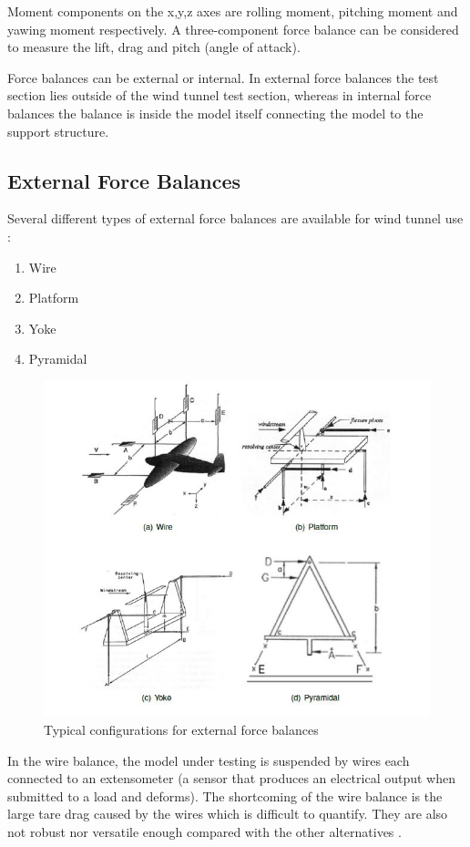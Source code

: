 Moment components on the x,y,z axes are rolling moment, pitching moment and yawing moment respectively. A three-component force balance can be considered to measure the lift, drag and pitch (angle of attack).

Force balances can be external or internal. In external force balances the test section lies outside of the wind tunnel test section, whereas in internal force balances the balance is inside the model itself connecting the model to the support structure.
\subsection{External Force Balances}
Several different types of external force balances are available for wind tunnel use
\cite{morris_force_2010}:
\begin{enumerate}
\item Wire
\item Platform
\item Yoke
\item Pyramidal
\end{enumerate}
\begin{center}
	\begin{figure}[H]
	\centering
	\includegraphics{Figures/Fig6}
	\caption[External Force balances]{Typical configurations for external force balances \cite{ferreira2015design}}
	\end{figure}
\end{center}
In the wire balance, the model under testing is suspended by wires each connected to an extensometer (a sensor that produces an electrical output when submitted to a load and deforms). The shortcoming of the wire balance is the large tare drag caused by the wires which is difficult to quantify. They are also not robust nor versatile enough compared with the other alternatives \cite{ferreira2015design}. 

